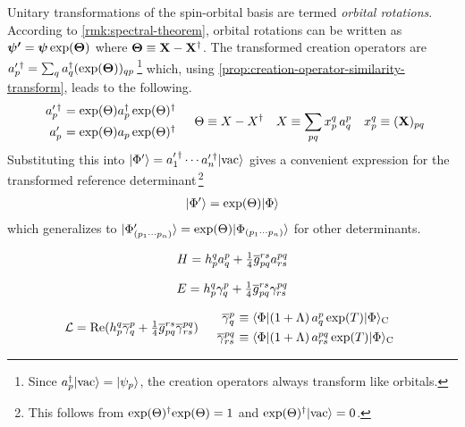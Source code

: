 \documentclass[11pt]{article}
\numberwithin{equation}{section}
\begin{document}
\begin{rmk}
Unitary transformations of the spin-orbital basis are termed \textit{orbital rotations}.
According to \cref{rmk:spectral-theorem}, orbital rotations can be written as
$
  \bm{\y'}
=
  \bm{\y}\,
  \mr{exp}(\bm{\Th})
$
where
$
  \bm{\Th}
\equiv
  \bo{X}
-
  \bo{X}\dg
$.
The transformed creation operators are
$
  a_p^{\prime\,\dagger}
=
  \sum_q
  a_q\dg
  (\mr{exp}(\bm{\Th}))_{qp}
$\,\footnote{Since $a_p^\dagger|\mathrm{vac}\rangle=|\psi _p\rangle$, the creation operators always transform like orbitals.}
which, using \cref{prop:creation-operator-similarity-transform}, leads to the following.
\begin{align}
\begin{array}{r@{\ }l}
  a_p^{\prime\,\dagger}
&=
  \mr{exp}(\Th)
  a_p\dg\,
  \mr{exp}(\Th)\dg
\\[5pt]
  a_p^{\prime}
&=
  \mr{exp}(\Th)
  a_p\,
  \mr{exp}(\Th)\dg
\end{array}
&&
  \Th
\equiv
  X
-
  X\dg
&&
  X
\equiv
  \sum_{pq}
  x_p^q\,
  a^p_q
&&
  x_p^q
\equiv
  (\bo{X})_{pq}
\end{align}
Substituting this into 
$
  |\Phi '\rangle
=
  a_1^{\prime\,\dagger}
  \cdots
  a_n^{\prime\,\dagger}
  |\mathrm{vac}\rangle
$
gives a convenient expression for the transformed reference determinant\,\footnote{This follows from 
$
  \mathrm{exp}(\Theta )^\dagger
  \mathrm{exp}(\Theta )
=
  1
$
and
$
  \mathrm{exp}(\Theta )^\dagger
  |\mathrm{vac}\rangle
=
  0
$.
}
\begin{align}
  |\Phi '\rangle
=
  \mathrm{exp}(\Theta )
  |\Phi \rangle
\end{align}
which generalizes to 
$
  |\Phi '_{(p_1\cdots p_n)}\rangle
=
  \mathrm{exp}(\Theta )
  |\Phi _{(p_1\cdots p_n)}\rangle
$
for other determinants.
\end{rmk}

\begin{rmk}
\end{rmk}

\begin{align}
  H
=
  h_p^q
  a^p_q
+
  \tfrac{1}{4}
  \overline{g}_{pq}^{rs}
  a^{pq}_{rs}
\end{align}

\begin{align}
  E
=
  h_p^q
  \gamma ^p_q
+
  \tfrac{1}{4}
  \overline{g}_{pq}^{rs}
  \gamma ^{pq}_{rs}
\end{align}

\begin{align}
  \mc{L}
=
  \mr{Re}
  (
    h_p^q
    \ol{\g}^p_q
  +
    \tfr{1}{4}
    \ol{g}_{pq}^{rs}
    \ol{\g}^{pq}_{rs}
  )
&&
\begin{array}{r@{\ }l}
  \ol{\g}^p_q
&\equiv
  \ip{\F|(1+\La)\,a^p_q\,\mr{exp}(T)|\F}_\mr{C}
\\[4pt]
  \ol{\g}^{pq}_{rs}
&\equiv
  \ip{\F|(1+\La)\,a^{pq}_{rs}\,\mr{exp}(T)|\F}_\mr{C}
\end{array}
\end{align}
\end{document}
